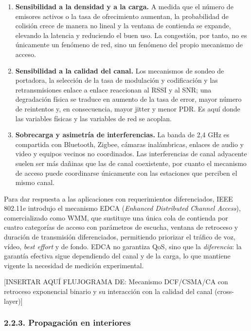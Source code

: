 \documentclass[
  12pt,
]{article}
\providecommand{\tightlist}{%
  \setlength{\itemsep}{0pt}\setlength{\parskip}{0pt}}
\begin{document}
\begin{enumerate}
\def\labelenumi{\arabic{enumi}.}
\tightlist
\item
  \textbf{Sensibilidad a la densidad y a la carga.} A medida que el
  número de emisores activos o la tasa de ofrecimiento aumentan, la
  probabilidad de colisión crece de manera no lineal y la ventana de
  contienda se expande, elevando la latencia y reduciendo el buen uso.
  La congestión, por tanto, no es únicamente un fenómeno de red, sino un
  fenómeno del propio mecanismo de acceso.
\item
  \textbf{Sensibilidad a la calidad del canal.} Los mecanismos de sondeo
  de portadora, la selección de la tasa de modulación y codificación y
  las retransmisiones enlace a enlace reaccionan al RSSI y al SNR; una
  degradación física se traduce en aumento de la tasa de error, mayor
  número de reintentos y, en consecuencia, mayor jitter y menor PDR. Es
  aquí donde las variables físicas y las variables de red se acoplan.
\item
  \textbf{Sobrecarga y asimetría de interferencias.} La banda de 2,4 GHz
  es compartida con Bluetooth, Zigbee, cámaras inalámbricas, enlaces de
  audio y video y equipos vecinos no coordinados. Las interferencias de
  canal adyacente suelen ser más dañinas que las de canal coexistente,
  por cuanto el mecanismo de acceso puede coordinarse únicamente con las
  estaciones que perciben el mismo canal.
\end{enumerate}

Para dar respuesta a las aplicaciones con requerimientos diferenciados,
IEEE 802.11e introdujo el mecanismo EDCA (\emph{Enhanced Distributed
Channel Access}), comercializado como WMM, que sustituye una única cola
de contienda por cuatro categorías de acceso con parámetros de escucha,
ventana de retroceso y duración de transmisión diferenciados,
permitiendo priorizar el tráfico de voz, vídeo, \emph{best effort} y de
fondo. EDCA no garantiza QoS, sino que la \emph{diferencia}: la garantía
efectiva sigue dependiendo del canal y de la carga, lo que mantiene
vigente la necesidad de medición experimental.

{[}INSERTAR AQUÍ FLUJOGRAMA DE: Mecanismo DCF/CSMA/CA con retroceso
exponencial binario y su interacción con la calidad del canal
(cross-layer){]}

\subsubsection{2.2.3. Propagación en
interiores}\label{propagaciuxf3n-en-interiores}
\end{document}
